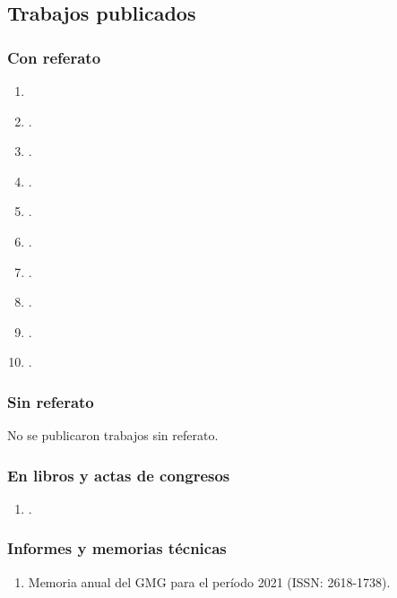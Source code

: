 \documentclass[a4paper,11pt,twoside,final,titlepage,onecolumn,openright]{report}
\begin{document}
\subsection{Trabajos publicados}

\subsubsection{Con referato}

% 


\begin{enumerate}
    \item {}
    \item {}.
    \item {}.
    \item {}.
    \item {}.
    \item {}.
    \item {}.
    \item {}.
    \item {}.
    \item {}.
\end{enumerate}

\subsubsection{Sin referato}
No se publicaron trabajos sin referato.

\subsubsection{En libros y actas de congresos}

\begin{enumerate}
    \item {}.
\end{enumerate}

\subsubsection{Informes y memorias técnicas}
\begin{enumerate}
 \item Memoria anual del GMG para el período 2021 (ISSN: 2618-1738).
\end{enumerate}
\end{document}
